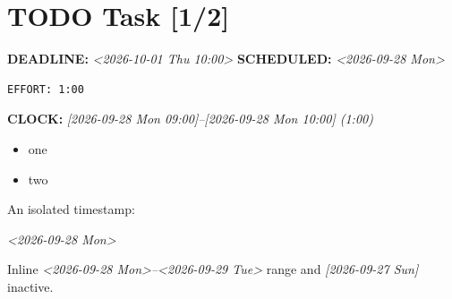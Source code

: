 \documentclass[11pt]{article}
\date{\today}
\title{}
\begin{document}
\tableofcontents

\section{{\bfseries\sffamily TODO} Task [1/2]}
\label{sec:org1c59b52}
\noindent\textbf{DEADLINE:} \textit{<2026-10-01 Thu 10:00>} \textbf{SCHEDULED:} \textit{<2026-09-28 Mon> }\\
\begin{verbatim}
EFFORT: 1:00
\end{verbatim}
\noindent\textbf{CLOCK:} \textit{[2026-09-28 Mon 09:00]--[2026-09-28 Mon 10:00]  (1:00)}\\
\begin{itemize}
\item[{$\boxtimes$}] one
\item[{$\square$}] two
\end{itemize}

An isolated timestamp:

\textit{<2026-09-28 Mon>}

Inline \textit{<2026-09-28 Mon>--<2026-09-29 Tue> } range and \textit{{[}2026-09-27 Sun] } inactive.
\end{document}

